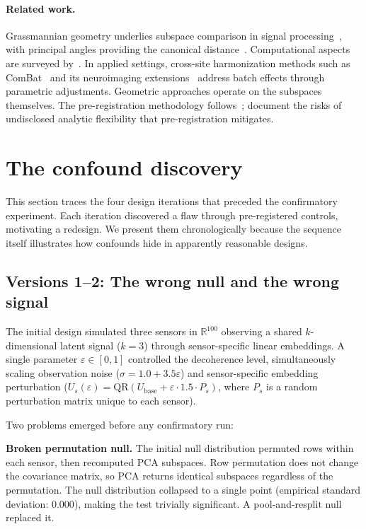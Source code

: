 \documentclass[11pt]{article}
\newcommand{\eps}{\varepsilon}
\begin{document}
\paragraph{Related work.}
Grassmannian geometry underlies subspace comparison in signal
processing~\citep{edelman1998geometry}, with principal angles
providing the canonical distance~\citep{golub1973numerical,
ye2016schubert}.  Computational aspects are surveyed
by~\citet{bendokat2024grassmann}.  In applied settings,
cross-site harmonization methods such as
ComBat~\citep{johnson2007adjusting} and its neuroimaging
extensions~\citep{fortin2018harmonization} address batch effects
through parametric adjustments.  Geometric approaches operate
on the subspaces themselves.  The pre-registration
methodology follows~\citet{nosek2018preregistration};
\citet{simmons2011false} document the risks of undisclosed
analytic flexibility that pre-registration mitigates.

\section{The confound discovery}
\label{sec:confound}

This section traces the four design iterations that preceded the
confirmatory experiment.  Each iteration discovered a flaw through
pre-registered controls, motivating a redesign.  We present them
chronologically because the sequence itself illustrates how
confounds hide in apparently reasonable designs.

\subsection{Versions 1--2: The wrong null and the wrong signal}
\label{sec:v1v2}

The initial design simulated three sensors in $\mathbb{R}^{100}$
observing a shared $k$-dimensional latent signal ($k = 3$) through
sensor-specific linear embeddings.  A single parameter $\eps \in
[0, 1]$ controlled the decoherence level, simultaneously
scaling observation noise ($\sigma = 1.0 + 3.5\eps$) and
sensor-specific embedding perturbation ($U_s(\eps) =
\mathrm{QR}(U_\mathrm{base} + \eps \cdot 1.5 \cdot P_s)$, where
$P_s$ is a random perturbation matrix unique to each sensor).

Two problems emerged before any confirmatory run:

\textbf{Broken permutation null.}  The initial null distribution
permuted rows within each sensor, then recomputed PCA subspaces.
Row permutation does not change the covariance matrix, so PCA
returns identical subspaces regardless of the permutation.  The
null distribution collapsed to a single point (empirical standard
deviation: $0.000$), making the test trivially significant.  A
pool-and-resplit null replaced it.
\end{document}
